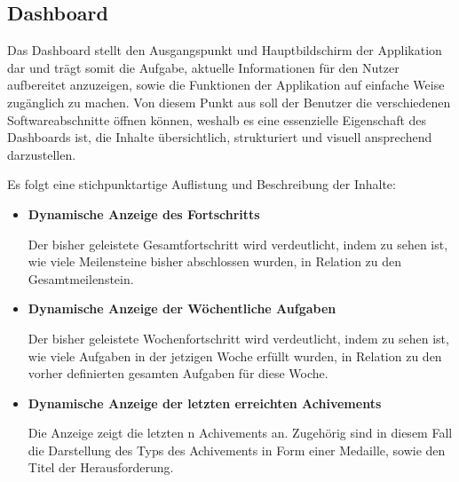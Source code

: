 \documentclass{scrreprt}
\begin{document}
\newpage
\subsection{Dashboard}
\par Das Dashboard stellt den Ausgangspunkt und Hauptbildschirm der Applikation dar und trägt somit die Aufgabe, aktuelle Informationen für den Nutzer aufbereitet anzuzeigen, sowie die Funktionen der Applikation auf einfache Weise zugänglich zu machen. Von diesem Punkt aus soll der Benutzer die verschiedenen Softwareabschnitte öffnen können, weshalb es eine essenzielle Eigenschaft des Dashboards ist, die Inhalte übersichtlich, strukturiert und visuell ansprechend darzustellen.\\

\par Es folgt eine stichpunktartige Auflistung und Beschreibung der Inhalte:
\begin{itemize}
\item \textbf{Dynamische Anzeige des Fortschritts}
\par Der bisher geleistete Gesamtfortschritt wird verdeutlicht, indem zu sehen ist, wie viele Meilensteine bisher abschlossen wurden, in Relation zu den Gesamtmeilenstein.
\item \textbf{Dynamische Anzeige der Wöchentliche Aufgaben}
\par Der bisher geleistete Wochenfortschritt wird verdeutlicht, indem zu sehen ist, wie viele Aufgaben in der jetzigen Woche erfüllt wurden, in Relation zu den vorher definierten gesamten Aufgaben für diese Woche.
\item \textbf{Dynamische Anzeige der letzten erreichten Achivements}
\par Die Anzeige zeigt die letzten n Achivements an. Zugehörig sind in diesem Fall die Darstellung des Typs des Achivements in Form einer Medaille, sowie den Titel der Herausforderung.
\end{itemize}
\end{document}

